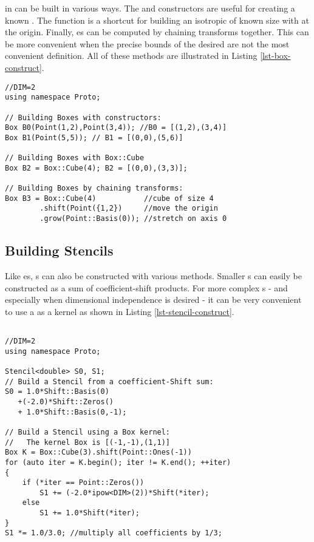 \documentclass[12pt]{article}
\begin{document}
 in \libname can be built in various ways. The  and  constructors are useful for creating a known . The  function is a shortcut for building an isotropic  of known size with  at the origin. Finally, es can be computed by chaining transforms together. This can be more convenient when the precise bounds of the desired  are not the most convenient definition. All of these methods are illustrated in Listing \ref{lst-box-construct}.

\begin{lstlisting}[caption=Box Construction Idiom, label=lst-box-construct]
//DIM=2
using namespace Proto;

// Building Boxes with constructors:
Box B0(Point(1,2),Point(3,4)); //B0 = [(1,2),(3,4)]
Box B1(Point(5,5)); // B1 = [(0,0),(5,6)]

// Building Boxes with Box::Cube
Box B2 = Box::Cube(4); B2 = [(0,0),(3,3)];

// Building Boxes by chaining transforms:
Box B3 = Box::Cube(4)			//cube of size 4
		.shift(Point({1,2})     //move the origin
		.grow(Point::Basis(0));	//stretch on axis 0

\end{lstlisting}

\subsection{Building Stencils}

Like es, s can also be constructed with various methods. Smaller s can easily be constructed as a sum of coefficient-shift products. For more complex s - and especially when dimensional independence is desired - it can be very convenient to use a  as a kernel as shown in Listing \ref{lst-stencil-construct}. 

\begin{lstlisting}[label=lst-stencil-construct, caption=Stencil Construction Methods]

//DIM=2
using namespace Proto;

Stencil<double> S0, S1;
// Build a Stencil from a coefficient-Shift sum:
S0 = 1.0*Shift::Basis(0)
   +(-2.0)*Shift::Zeros()
   + 1.0*Shift::Basis(0,-1);
   
// Build a Stencil using a Box kernel:
//   The kernel Box is [(-1,-1),(1,1)]
Box K = Box::Cube(3).shift(Point::Ones(-1)) 
for (auto iter = K.begin(); iter != K.end(); ++iter)
{
	if (*iter == Point::Zeros())
		S1 += (-2.0*ipow<DIM>(2))*Shift(*iter);
	else
		S1 += 1.0*Shift(*iter);
}
S1 *= 1.0/3.0; //multiply all coefficients by 1/3;

\end{lstlisting}
\end{document}
